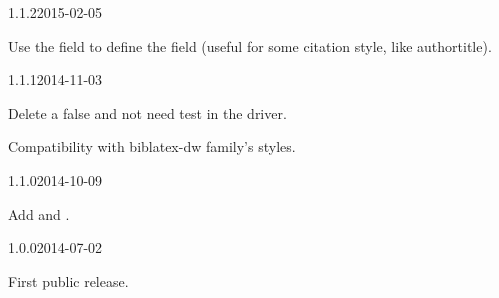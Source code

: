 \documentclass{ltxdockit}[2011/03/25]
\begin{document}
\begin{changelog}
\begin{release}{1.1.2}{2015-02-05}
\item Use the  field to define the  field (useful for some citation style, like authortitle).
\end{release}

\begin{release}{1.1.1}{2014-11-03}
\item Delete a false and not need test in the driver.
\item Compatibility with biblatex-dw family's styles.
\end{release}
\begin{release}{1.1.0}{2014-10-09}
\item Add  and .
\end{release}

\begin{release}{1.0.0}{2014-07-02}
\item First public release.
\end{release}
\end{changelog}
\end{document}
